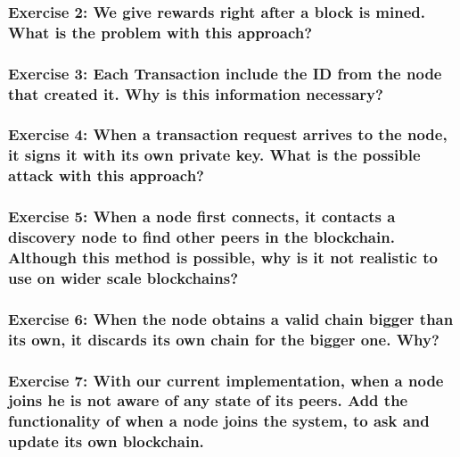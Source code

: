 \documentclass[12pt,a4paper]{article}
\theoremstyle{definition}
\begin{document}
\subsubsection*{Exercise 2: We give rewards right after a block is mined. What is the problem with this approach?}

\subsubsection*{Exercise 3: Each Transaction include the ID from the node that created it. Why is this information necessary?}

\subsubsection*{Exercise 4: When a transaction request arrives to the node, it signs it with its own private key. What is the possible attack with this approach?}

\subsubsection*{Exercise 5: When a node first connects, it contacts a discovery node to find other peers in the blockchain. Although this method is possible, why is it not realistic to use on wider scale blockchains? }

\subsubsection*{Exercise 6: When the node obtains a valid chain bigger than its own, it discards its own chain for the bigger one. Why? }

\subsubsection*{Exercise 7: With our current implementation, when a node joins he is not aware of any state of its peers. Add the functionality of when a node joins the system, to ask and update its own blockchain.}



\end{document}

